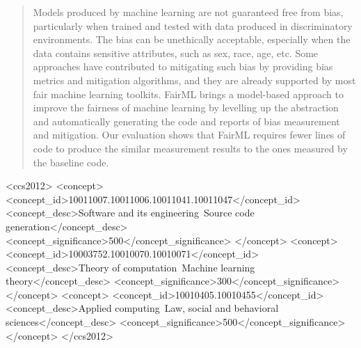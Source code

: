 \documentclass[sigconf,review]{acmart}
\begin{document}
\renewcommand{\shortauthors}{Yohannis and Kolovos}

\begin{abstract}
Models produced by machine learning are not guaranteed free from bias, particularly when trained and tested with data produced in discriminatory environments. The bias can be unethically acceptable, especially when the data contains sensitive attributes, such as sex, race, age, etc. Some approaches have contributed to mitigating such bias by providing bias metrics and mitigation algorithms, and they are already supported by most fair machine learning toolkits. FairML brings a model-based approach to improve the fairness of machine learning by levelling up the abstraction and automatically generating the code and reports of bias measurement and mitigation. Our evaluation shows that FairML requires fewer lines of code to produce the similar measurement results to the ones measured by the baseline code.
\end{abstract}

\begin{CCSXML}
	<ccs2012>
	<concept>
	<concept_id>10011007.10011006.10011041.10011047</concept_id>
	<concept_desc>Software and its engineering~Source code generation</concept_desc>
	<concept_significance>500</concept_significance>
	</concept>
	<concept>
	<concept_id>10003752.10010070.10010071</concept_id>
	<concept_desc>Theory of computation~Machine learning theory</concept_desc>
	<concept_significance>300</concept_significance>
	</concept>
	<concept>
	<concept_id>10010405.10010455</concept_id>
	<concept_desc>Applied computing~Law, social and behavioral sciences</concept_desc>
	<concept_significance>500</concept_significance>
	</concept>
	</ccs2012>
\end{CCSXML}


\end{document}
